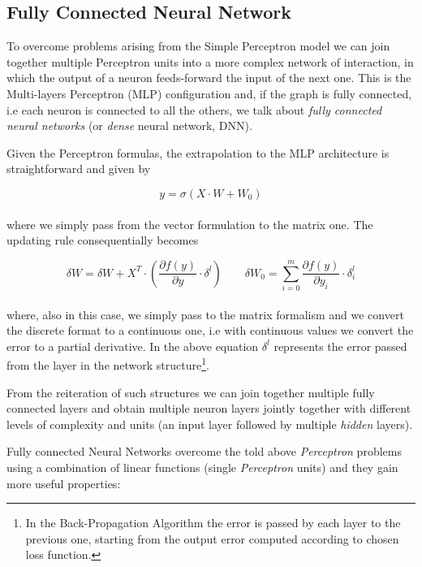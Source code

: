 \documentclass{standalone}
\begin{document}
\subsection[Fully Connected Neural Network]{Fully Connected Neural Network}\label{NN:connected}

To overcome problems arising from the Simple Perceptron model we can join together multiple Perceptron units into a more complex network of interaction, in which the output of a neuron feeds-forward the input of the next one.
This is the Multi-layers Perceptron (MLP) configuration and, if the graph is fully connected, i.e each neuron is connected to all the others, we talk about \emph{fully connected neural networks} (or \emph{dense} neural network, DNN).

Given the Perceptron formulas, the extrapolation to the MLP architecture is straightforward and given by

$$
y = \sigma\left(X \cdot W + W_0 \right)
$$
\\
where we simply pass from the vector formulation to the matrix one.
The updating rule consequentially becomes

$$
\delta W = \delta W + X^T \cdot \left( \frac{\partial f(y)}{\partial y} \cdot \delta^l \right) \quad\quad \delta W_0 = \sum_{i=0}^{m}\frac{\partial f(y)}{\partial y_i} \cdot \delta_i^l
$$
\\
where, also in this case, we simply pass to the matrix formalism and we convert the discrete format to a continuous one, i.e with continuous values we convert the error to a partial derivative.
In the above equation $\delta^l$ represents the error passed from the  layer in the network structure\footnote{
  In the Back-Propagation Algorithm the error is passed by each layer to the previous one, starting from the output error computed according to chosen loss function.
}.

From the reiteration of such structures we can join together multiple fully connected layers and obtain multiple neuron layers jointly together with different levels of complexity and units (an input layer followed by multiple \emph{hidden} layers).

Fully connected Neural Networks overcome the told above \emph{Perceptron} problems using a combination of linear functions (single \emph{Perceptron} units) and they gain more useful properties:
\end{document}
